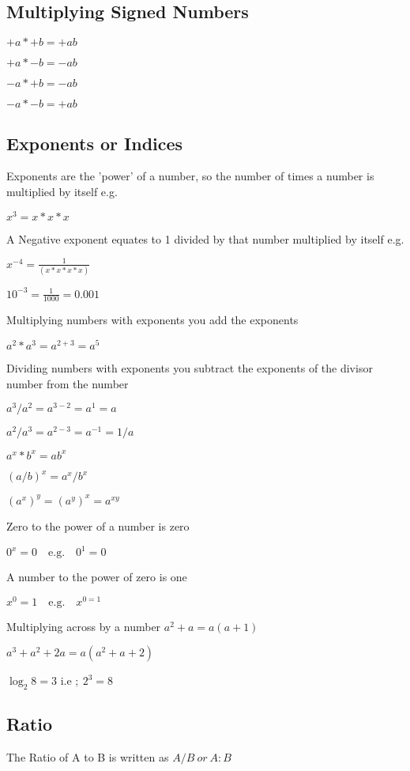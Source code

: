 \documentclass{article}
\begin{document}
\subsection{Multiplying Signed Numbers}

$+a * +b = +ab$

$+a * -b = -ab$

$-a * +b = -ab$

$-a * -b = +ab$

\subsection{Exponents or Indices}
Exponents are the 'power' of a number, so the number of times a number is multiplied by itself e.g.

$x^{3} = x * x * x$

A Negative exponent equates to 1 divided by that number multiplied by itself e.g.

$x^{-4} = \frac{1}{(x * x * x * x)}$

$ 10^{-3}  = \frac{1}{1000} = 0.001 $


Multiplying numbers with exponents you add the exponents 

$a^{2} * a^{3} = a^{2+3} = a^{5}$

Dividing numbers with exponents you subtract the exponents of the divisor number from the number 

$a^{3} / a^{2} = a^{3-2} = a^{1} = a$

$a^{2} / a^{3} = a^{2-3} = a^{-1} = 1/a$

$ a^{x} * b^{x} = ab^{x}$

$ (a/b)^{x} = a^{x} / b^{x} $

$ (a^{x})^{y} =  (a^{y})^{x}  = a^{xy}$


Zero to the power of a number is zero

$ 0^{x} = 0 \quad \textrm{e.g.} \quad  0^{1} = 0$

A number to the power of zero is one

$ x^{0} = 1 \quad \textrm{e.g.} \quad  x^{0 =1}$

Multiplying across by a number 
$a^{2} + a = a (a + 1) $

$a^{3} + a^{2} + 2a = a (a^{2} + a  + 2 )$

$ \log_2 8 = 3$ i.e $;\ 2^{3} = 8$
\subsection{Ratio}
The Ratio of A to B is written as $ A/B \ or \ A : B$
\end{document}

